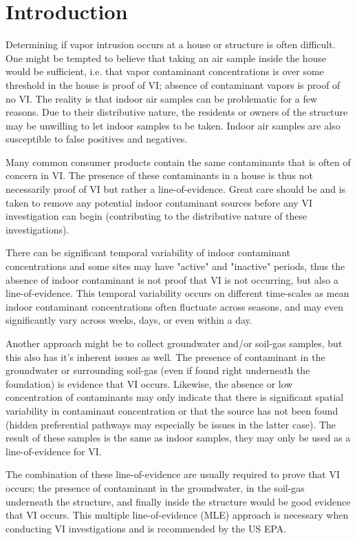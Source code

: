 \documentclass[../thesis.tex]{subfiles}
\begin{document}
\chapter{Introduction}


Determining if vapor intrusion occurs at a house or structure is often difficult.
One might be tempted to believe that taking an air sample inside the house would be sufficient, i.e. that vapor contaminant concentrations is over some threshold in the house is proof of VI; absence of contaminant vapors is proof of no VI.
The reality is that indoor air samples can be problematic for a few reasons.
Due to their distributive nature, the residents or owners of the structure may be unwilling to let indoor samples to be taken.
Indoor air samples are also susceptible to false positives and negatives. \par

Many common consumer products contain the same contaminants that is often of concern in VI.
The presence of these contaminants in a house is thus not necessarily proof of VI but rather a line-of-evidence.
Great care should be and is taken to remove any potential indoor contaminant sources before any VI investigation can begin (contributing to the distributive nature of these investigations). \par

There can be significant temporal variability of indoor contaminant concentrations and some sites may have "active" and "inactive" periods, thus the absence of indoor contaminant is not proof that VI is not occurring, but also a line-of-evidence.
This temporal variability occurs on different time-scales as mean indoor contaminant concentrations often fluctuate across seasons, and may even significantly vary across weeks, days, or even within a day. \par

Another approach might be to collect groundwater and/or soil-gas samples, but this also has it's inherent issues as well.
The presence of contaminant in the groundwater or surrounding soil-gas (even if found right underneath the foundation) is evidence that VI occurs.
Likewise, the absence or low concentration of contaminants may only indicate that there is significant spatial variability in contaminant concentration or that the source has not been found (hidden preferential pathways may especially be issues in the latter case).
The result of these samples is the same as indoor samples, they may only be used as a line-of-evidence for VI.\par

The combination of these line-of-evidence are usually required to prove that VI occurs; the presence of contaminant in the groundwater, in the soil-gas underneath the structure, and finally inside the structure would be good evidence that VI occurs.
This multiple line-of-evidence (MLE) approach is necessary when conducting VI investigations and is recommended by the US EPA.\par
\end{document}

